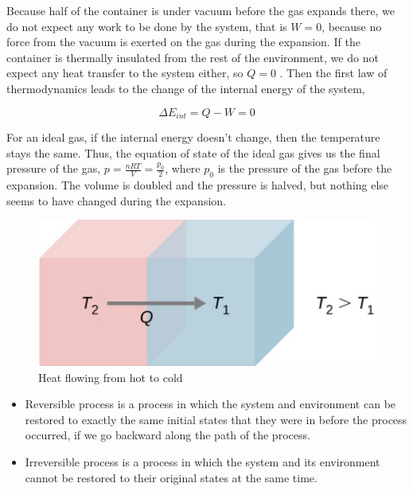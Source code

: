 \documentclass[14pt]{memoir}
\begin{document}
Because half of the container is under vacuum before the gas expands there, we do not expect any work to be done by the system, that is $W=0$, because no force from the vacuum is exerted on the gas during the expansion. If the container is thermally insulated from the rest of the environment, we do not expect any heat transfer to the system either, so  $Q=0$ . Then the first law of thermodynamics leads to the change of the internal energy of the system,

\begin{equation}
\Delta E_{int} = Q - W = 0
\end{equation}

 
For an ideal gas, if the internal energy doesn't change, then the temperature stays the same. Thus, the equation of state of the ideal gas gives us the final pressure of the gas,  $p=\frac{nRT}{V} = \frac{p_0}{2}$,  where  $p_0$  is the pressure of the gas before the expansion. The volume is doubled and the pressure is halved, but nothing else seems to have changed during the expansion.


\begin{figure}[H]
\begin{center}
\includegraphics[scale=.4]{fig/fig_04_03.jpg}
\caption{Heat flowing from hot to cold}
\label{fig:04_03}
\end{center}
\end{figure}

\begin{itemize}
\item Reversible process is a process in which the system and environment can be restored to exactly the same initial states that they were in before the process occurred, if we go backward along the path of the process.
\item Irreversible process is a process in which the system and its environment cannot be restored to their original states at the same time.
\end{itemize}
\end{document}
